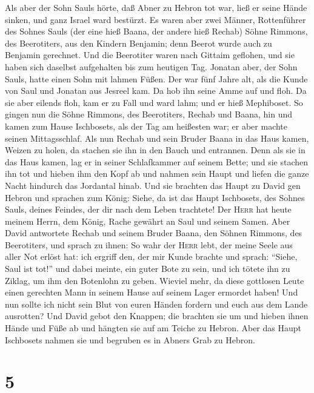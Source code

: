  Als aber der Sohn Sauls hörte, daß Abner zu Hebron tot
war, ließ er seine Hände sinken, und ganz Israel ward bestürzt.
 Es waren aber zwei Männer, Rottenführer des Sohnes Sauls
(der eine hieß Baana, der andere hieß Rechab) Söhne Rimmons, des
Beerotiters, aus den Kindern Benjamin; denn Beerot wurde auch zu
Benjamin gerechnet.  Und die Beerotiter waren nach Gittaim
geflohen, und sie haben sich daselbst aufgehalten bis zum heutigen Tag.
 Jonatan aber, der Sohn Sauls, hatte einen Sohn mit lahmen
Füßen. Der war fünf Jahre alt, als die Kunde von Saul und Jonatan aus
Jesreel kam. Da hob ihn seine Amme auf und floh. Da sie aber eilends
floh, kam er zu Fall und ward lahm; und er hieß Mephiboset.
 So gingen nun die Söhne Rimmons, des Beerotiters, Rechab
und Baana, hin und kamen zum Hause Ischbosets, als der Tag am heißesten
war; er aber machte seinen Mittagsschlaf.  Als nun Rechab
und sein Bruder Baana in das Haus kamen, Weizen zu holen, da stachen sie
ihn in den Bauch und entrannen.  Denn als sie in das Haus
kamen, lag er in seiner Schlafkammer auf seinem Bette; und sie stachen
ihn tot und hieben ihm den Kopf ab und nahmen sein Haupt und liefen die
ganze Nacht hindurch das Jordantal hinab.  Und sie
brachten das Haupt zu David gen Hebron und sprachen zum König: Siehe, da
ist das Haupt Ischbosets, des Sohnes Sauls, deines Feindes, der dir nach
dem Leben trachtete! Der \textsc{Herr} hat heute meinem Herrn, dem
König, Rache gewährt an Saul und seinem Samen.  Aber David
antwortete Rechab und seinem Bruder Baana, den Söhnen Rimmons, des
Beerotiters, und sprach zu ihnen: So wahr der \textsc{Herr} lebt, der
meine Seele aus aller Not erlöst hat:  ich ergriff den,
der mir Kunde brachte und sprach: ``Siehe, Saul ist tot!'' und dabei
meinte, ein guter Bote zu sein, und ich tötete ihn zu Ziklag, um ihm den
Botenlohn zu geben.  Wieviel mehr, da diese gottlosen
Leute einen gerechten Mann in seinem Hause auf seinem Lager ermordet
haben! Und nun sollte ich nicht sein Blut von euren Händen fordern und
euch aus dem Lande ausrotten?  Und David gebot den
Knappen; die brachten sie um und hieben ihnen Hände und Füße ab und
hängten sie auf am Teiche zu Hebron. Aber das Haupt Ischbosets nahmen
sie und begruben es in Abners Grab zu Hebron.

\hypertarget{section-4}{%
\section{5}\label{section-4}}

